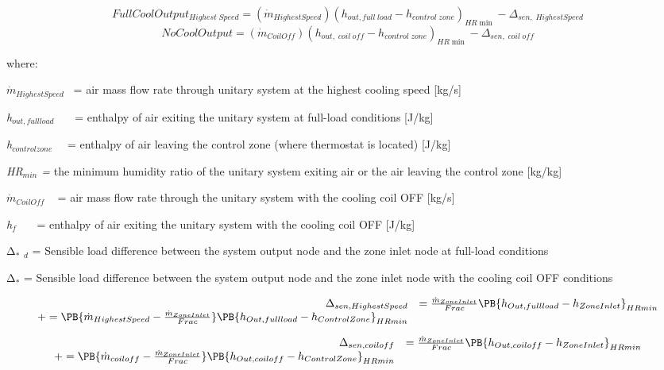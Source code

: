 \[FullCoolOutpu{t_{Highest\;Speed}} = ({\dot m_{HighestSpeed}}){({h_{out,full\;load}} - {h_{control\;zone}})_{HR\min }} - {\Delta_{sen,\;HighestSpeed}}\] \[NoCoolOutput = ({\dot m_{CoilOff}}){({h_{out,\;coil\;off}} - {h_{control\;zone}})_{HR\min }} - {\Delta_{sen,\;coil\;off}}\]

where:

\emph{\({\dot m_{HighestSpeed}}\)}~ = air mass flow rate through unitary system at the highest cooling speed {[}kg/s{]}

\emph{h\(_{out,full load}\)}~~~ = enthalpy of air exiting the unitary system at full-load conditions {[}J/kg{]}

\emph{h\(_{control zone}\)}~~ = enthalpy of air leaving the control zone (where thermostat is located) {[}J/kg{]}

\emph{HR\(_{min}\) =} the minimum humidity ratio of the unitary system exiting air or the air leaving the control zone {[}kg/kg{]}

\emph{\(\dot m_{CoilOff}\)} ~ = air mass flow rate through the unitary system with the cooling coil OFF {[}kg/s{]}

\emph{h\(_{f}\)}~~~ = enthalpy of air exiting the unitary system with the cooling coil OFF {[}J/kg{]}

Δ\(_{*}\) \emph{\(_{d}\)} = Sensible load difference between the system output node and the zone inlet node at full-load conditions

Δ\(_{*}\) = Sensible load difference between the system output node and the zone inlet node with the cooling coil OFF conditions

\begin{equation}
  \begin{array}{rl}
    \Delta_{sen,HighestSpeed} &= \frac{\dot{m}_{ZoneInlet}}{Frac} \PB{h_{Out,full load} - h_{ZoneInlet}}_{HRmin} \\
                              += \PB{\dot{m}_{HighestSpeed} - \frac{\dot{m}_{ZoneInlet}}{Frac}} \PB{h_{Out,full load} - h_{ControlZone}}_{HRmin}
  \end{array}
\end{equation}

\begin{equation}
  \begin{array}{rl}
    \Delta_{sen,coil off} &= \frac{\dot{m}_{ZoneInlet}}{Frac} \PB{h_{Out,coil off} - h_{ZoneInlet}}_{HRmin} \\
                              += \PB{\dot{m}_{coil off} - \frac{\dot{m}_{ZoneInlet}}{Frac}} \PB{h_{Out,coil off} - h_{ControlZone}}_{HRmin}
  \end{array}
\end{equation}

